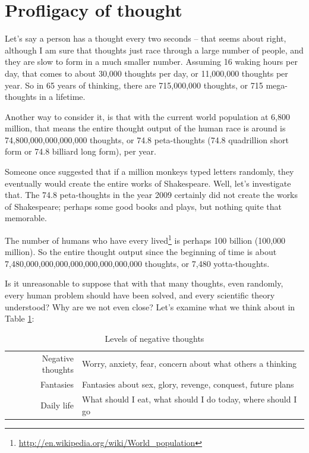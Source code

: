 \section{Profligacy of thought}

Let's say a person has a thought every two seconds -- that seems about right, although I am sure that thoughts just race through a large number of people, and they are slow to form in a much smaller number. Assuming 16 waking hours per day, that comes to about 30,000 thoughts per day, or 11,000,000 thoughts per year. So in 65 years of thinking, there are 715,000,000 thoughts, or 715 mega-thoughts in a lifetime.

Another way to consider it, is that with the current world population at 6,800 million, that means the entire thought output of the human race is around is 74,800,000,000,000,000 thoughts, or 74.8 peta-thoughts (74.8 quadrillion short form or 74.8 billiard long form), per year.

Someone once suggested that if a million monkeys typed letters randomly, they eventually would create the entire works of Shakespeare. Well, let's investigate that. The 74.8 peta-thoughts in the year 2009 certainly did not create the works of Shakespeare; perhaps some good books and plays, but nothing quite that memorable.

The number of humans who have every lived\footnote{\url{http://en.wikipedia.org/wiki/World\_population}} is perhaps 100 billion (100,000 million). So the entire thought output since the beginning of time is about 7,480,000,000,000,000,000,000,000,000 thoughts, or 7,480 yotta-thoughts.

Is it unreasonable to suppose that with that many thoughts, even randomly, every human problem should have been solved, and every scientific theory understood? Why are we not even close? Let's examine what we think about in Table \ref{tab:levesnegativethoughts}:

\begin{table}[h]\small\centering
\begin{tabular}{rl}\toprule
Negative thoughts & Worry, anxiety, fear, concern about what others a thinking \\

Fantasies & Fantasies about sex, glory, revenge, conquest, future plans \\

Daily life & What should I eat, what should I do today, where should I go\\\bottomrule
\end{tabular}
\caption{Levels of negative thoughts}
\label{tab:levesnegativethoughts}
\end{table}

